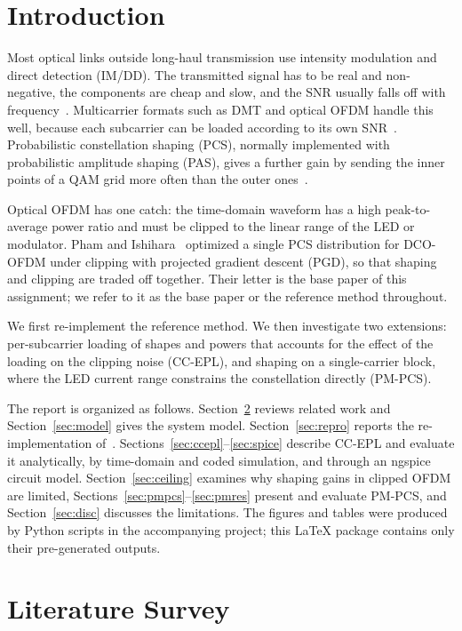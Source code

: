 \documentclass[conference]{IEEEtran}
\begin{document}
\section{Introduction}
Most optical links outside long-haul transmission use intensity modulation and direct detection (IM/DD). The transmitted signal has to be real and non-negative, the components are cheap and slow, and the SNR usually falls off with frequency~\cite{pang2020,che2024,che2022}. Multicarrier formats such as DMT and optical OFDM handle this well, because each subcarrier can be loaded according to its own SNR~\cite{ding2020,li2020,liu2022,cao2020}. Probabilistic constellation shaping (PCS), normally implemented with probabilistic amplitude shaping (PAS), gives a further gain by sending the inner points of a QAM grid more often than the outer ones~\cite{bocherer2023,gultekin2020,civelli2020}.

Optical OFDM has one catch: the time-domain waveform has a high peak-to-average power ratio and must be clipped to the linear range of the LED or modulator. Pham and Ishihara~\cite{pham2026} optimized a single PCS distribution for DCO-OFDM under clipping with projected gradient descent (PGD), so that shaping and clipping are traded off together. Their letter is the base paper of this assignment; we refer to it as the base paper or the reference method throughout.

We first re-implement the reference method. We then investigate two extensions: per-subcarrier loading of shapes and powers that accounts for the effect of the loading on the clipping noise (CC-EPL), and shaping on a single-carrier block, where the LED current range constrains the constellation directly (PM-PCS).

The report is organized as follows. Section~\ref{sec:lit} reviews related work and Section~\ref{sec:model} gives the system model. Section~\ref{sec:repro} reports the re-implementation of~\cite{pham2026}. Sections~\ref{sec:ccepl}--\ref{sec:spice} describe CC-EPL and evaluate it analytically, by time-domain and coded simulation, and through an ngspice circuit model. Section~\ref{sec:ceiling} examines why shaping gains in clipped OFDM are limited, Sections~\ref{sec:pmpcs}--\ref{sec:pmres} present and evaluate PM-PCS, and Section~\ref{sec:disc} discusses the limitations. The figures and tables were produced by Python scripts in the accompanying project; this LaTeX package contains only their pre-generated outputs.

\section{Literature Survey}\label{sec:lit}
\end{document}
